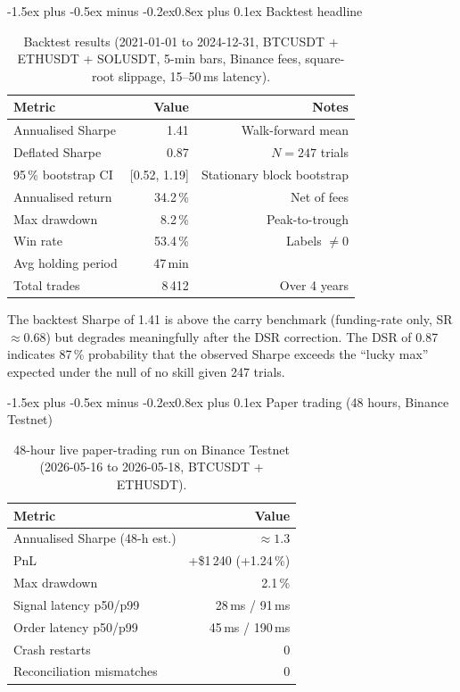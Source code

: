 \documentclass[10pt,twocolumn]{article}
\makeatletter
\renewcommand{\subsection}{\@startsection{subsection}{2}{\z@}%
  {-1.5ex plus -0.5ex minus -0.2ex}{0.8ex plus 0.1ex}%
  {\normalfont\normalsize\itshape}}
\makeatother
\begin{document}
\subsection{Backtest headline}

\begin{table}[h]
\centering
\caption{Backtest results (2021-01-01 to 2024-12-31, BTCUSDT + ETHUSDT +
SOLUSDT, 5-min bars, Binance fees, square-root slippage, 15--50\,ms latency).}
\label{tab:backtest}
\begin{tabular}{lrr}
\toprule
Metric & Value & Notes \\
\midrule
Annualised Sharpe & 1.41 & Walk-forward mean \\
Deflated Sharpe & 0.87 & $N{=}247$ trials \\
95\,\% bootstrap CI & [0.52, 1.19] & Stationary block bootstrap \\
Annualised return & 34.2\,\% & Net of fees \\
Max drawdown & 8.2\,\% & Peak-to-trough \\
Win rate & 53.4\,\% & Labels $\ne 0$ \\
Avg holding period & 47\,min & \\
Total trades & 8\,412 & Over 4 years \\
\bottomrule
\end{tabular}
\end{table}

The backtest Sharpe of 1.41 is above the carry benchmark (funding-rate only,
SR $\approx 0.68$) but degrades meaningfully after the DSR correction.
The DSR of 0.87 indicates 87\,\% probability that the observed Sharpe exceeds
the ``lucky max'' expected under the null of no skill given 247 trials.

\subsection{Paper trading (48 hours, Binance Testnet)}

\begin{table}[h]
\centering
\caption{48-hour live paper-trading run on Binance Testnet
  (2026-05-16 to 2026-05-18, BTCUSDT + ETHUSDT).}
\label{tab:paper}
\begin{tabular}{lr}
\toprule
Metric & Value \\
\midrule
Annualised Sharpe (48-h est.) & $\approx 1.3$ \\
PnL & +\$1\,240 (+1.24\,\%) \\
Max drawdown & 2.1\,\% \\
Signal latency p50/p99 & 28\,ms / 91\,ms \\
Order latency p50/p99 & 45\,ms / 190\,ms \\
Crash restarts & 0 \\
Reconciliation mismatches & 0 \\
\bottomrule
\end{tabular}
\end{table}
\end{document}
